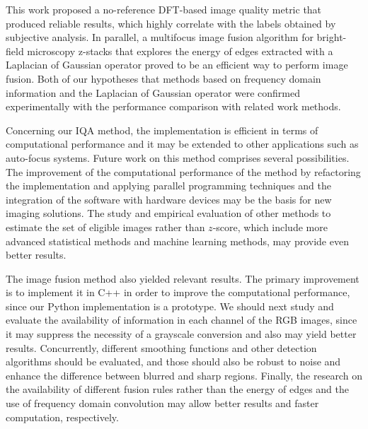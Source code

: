 This work proposed a no-reference DFT-based image quality metric that produced reliable results, which highly correlate with the labels obtained by subjective analysis. In parallel, a multifocus image fusion algorithm for bright-field microscopy z-stacks that explores the energy of edges extracted with a Laplacian of Gaussian operator proved to be an efficient way to perform image fusion. Both of our hypotheses that methods based on frequency domain information and the Laplacian of Gaussian operator were confirmed experimentally with the performance comparison with related work methods.

Concerning our IQA method, the implementation is efficient in terms of computational performance and it may be extended to other applications such as auto-focus systems. Future work on this method comprises several possibilities. The improvement of the computational performance of the method by refactoring the implementation and applying parallel programming techniques and the integration of the software with hardware devices may be the basis for new imaging solutions. The study and empirical evaluation of other methods to estimate the set of eligible images rather than $z$-score, which include more advanced statistical methods and machine learning methods, may provide even better results.

The image fusion method also yielded relevant results. The primary improvement is to implement it in C++ in order to improve the computational performance, since our Python implementation is a prototype. We should next study and evaluate the availability of information in each channel of the RGB images, since it may suppress the necessity of a grayscale conversion and also may yield better results. Concurrently, different smoothing functions and other detection algorithms should be evaluated, and those should also be robust to noise and enhance the difference between blurred and sharp regions. Finally, the research on the availability of different fusion rules rather than the energy of edges and the use of frequency domain convolution may allow better results and faster computation, respectively.